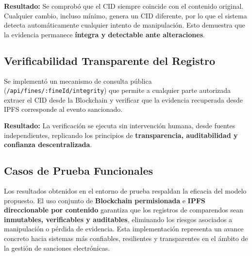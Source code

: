 \textbf{Resultado:} Se comprobó que el CID siempre coincide con el contenido original. Cualquier cambio, incluso mínimo, genera un CID diferente, por lo que el sistema detecta automáticamente cualquier intento de manipulación. Esto demuestra que la evidencia permanece \textbf{íntegra y detectable ante alteraciones}.

\subsection{Verificabilidad Transparente del Registro}

Se implementó un mecanismo de consulta pública (\texttt{/api/fines/:fineId/integrity}) que permite a cualquier parte autorizada extraer el CID desde la Blockchain y verificar que la evidencia recuperada desde IPFS corresponde al evento sancionado.

\textbf{Resultado:} La verificación se ejecuta sin intervención humana, desde fuentes independientes, replicando los principios de \textbf{transparencia, auditabilidad y confianza descentralizada}.

\subsection{Casos de Prueba Funcionales}



Los resultados obtenidos en el entorno de prueba respaldan la eficacia del modelo propuesto. El uso conjunto de \textbf{Blockchain permisionada} e \textbf{IPFS direccionable por contenido} garantiza que los registros de comparendos sean \textbf{inmutables, verificables y auditables}, eliminando los riesgos asociados a manipulación o pérdida de evidencia. Esta implementación representa un avance concreto hacia sistemas más confiables, resilientes y transparentes en el ámbito de la gestión de sanciones electrónicas. 